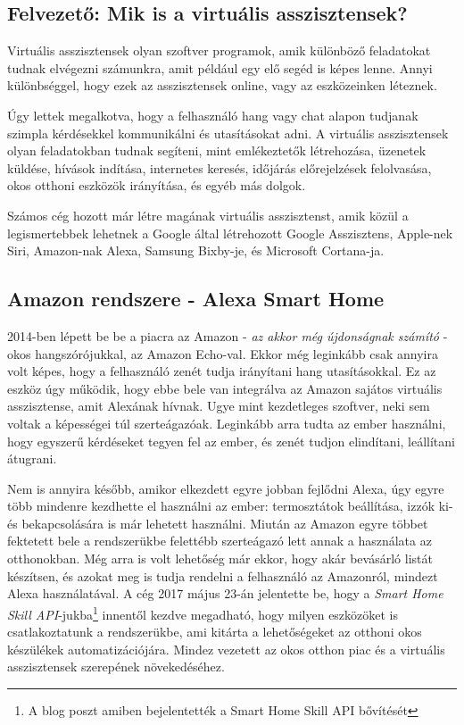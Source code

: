 \documentclass[
]{thesis-ekf}
\theoremstyle{definition}
\theoremstyle{remark}
\begin{document}
	\subsection*{Felvezető: Mik is a virtuális asszisztensek?}
	Virtuális asszisztensek olyan szoftver programok, amik különböző feladatokat tudnak elvégezni számunkra, amit például egy elő segéd is képes lenne. Annyi különbséggel, hogy ezek az asszisztensek online, vagy az eszközeinken léteznek. 
	
	Úgy lettek megalkotva, hogy a felhasználó hang vagy chat alapon tudjanak szimpla kérdésekkel kommunikálni és utasításokat adni. A virtuális asszisztensek olyan feladatokban tudnak segíteni, mint emlékeztetők létrehozása, üzenetek küldése, hívások indítása, internetes keresés, időjárás előrejelzések felolvasása, okos otthoni eszközök irányítása, és egyéb más dolgok. 
	
	Számos cég hozott már létre magának virtuális asszisztenst, amik közül a legismertebbek lehetnek a Google által létrehozott Google Asszisztens, Apple-nek Siri, Amazon-nak Alexa, Samsung Bixby-je, és Microsoft Cortana-ja.
	
	\subsection*{Amazon rendszere - Alexa Smart Home}
	2014-ben lépett be be a piacra az Amazon - \emph{az akkor még újdonságnak számító} - okos hangszórójukkal, az Amazon Echo-val. Ekkor még leginkább csak annyira volt képes, hogy a felhasználó zenét tudja irányítani hang utasításokkal. Ez az eszköz úgy működik, hogy ebbe bele van integrálva az Amazon sajátos virtuális asszisztense, amit Alexának hívnak. Ugye mint kezdetleges szoftver, neki sem voltak a képességei túl szerteágazóak. Leginkább arra tudta az ember használni, hogy egyszerű kérdéseket tegyen fel az ember, és zenét tudjon elindítani, leállítani átugrani.
	
	Nem is annyira később, amikor elkezdett egyre jobban fejlődni Alexa, úgy egyre több mindenre kezdhette el használni az ember: termosztátok beállítása, izzók ki- és bekapcsolására is már lehetett használni. Miután az Amazon egyre többet fektetett bele a rendszerükbe felettébb szerteágazó lett annak a használata az otthonokban. Még arra is volt lehetőség már ekkor, hogy akár bevásárló listát készítsen, és azokat meg is tudja rendelni a felhasználó az Amazonról, mindezt Alexa használatával. A cég 2017 május 23-án jelentette be, hogy a \emph{Smart Home Skill API}-jukba\footnote{A blog poszt amiben bejelentették a Smart Home Skill API bővítését\cite{amazon-api}} innentől kezdve megadható, hogy milyen eszközöket is csatlakoztatunk a rendszerükbe, ami kitárta a lehetőségeket az otthoni okos készülékek automatizációjára. Mindez vezetett az okos otthon piac és a virtuális asszisztensek szerepének növekedéséhez.
	
\end{document}
